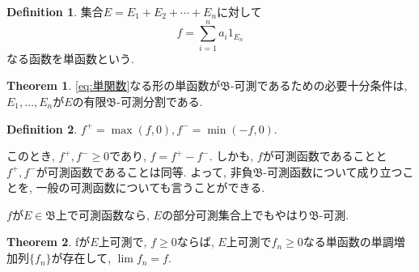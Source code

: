 \documentclass[a4j,dvipdfmx]{jsarticle}
\newcommand{\B}{\mathfrak{B}}
\theoremstyle{definition}
\newtheorem{definition}{Definition}[section]
\theoremstyle{definition}
\newtheorem{theorem}{Theorem}[section]
\numberwithin{equation}{section}
\begin{document}
            \begin{definition}
                集合$E=E_1+E_2+\cdots+E_n$に対して
                \begin{equation}
                    f=\sum_{i=1}^{n}a_i 1_{E_n} \label{eq:単関数}
                \end{equation}
                なる函数を単函数という.
            \end{definition}

            \begin{theorem}
                \eqref{eq:単関数}なる形の単函数が$\B$-可測であるための必要十分条件は, $E_1,\dots,E_n$が$E$の有限$\B$-可測分割である.
            \end{theorem}

            \begin{definition}
                $f^+=\max(f,0),f^-=\min(-f,0)$.
            \end{definition}
            このとき, $f^+,f^-\geq 0$であり, $f=f^+-f^-$. しかも, $f$が可測函数であることと$f^+,f^-$が可測函数であることは同等.
            よって, 非負$\B$-可測函数について成り立つことを, 一般の可測函数についても言うことができる.

            $f$が$E\in\B$上で可測函数なら, $E$の部分可測集合上でもやはり$\B$-可測.

            \begin{theorem}
                fが$E$上可測で, $f\geq0$ならば, $E$上可測で$f_n\geq0$なる単函数の単調増加列$\{f_n\}$が存在して, $\lim f_n = f$.
            \end{theorem}

            

            
\end{document}
